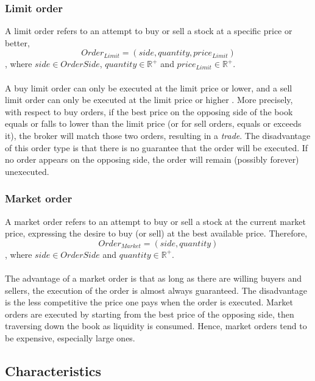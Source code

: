 \subsubsection{Limit order}
\label{sec:limit-order}

A limit order refers to an attempt to buy or sell a stock at a specific price or better,
\begin{equation}\label{eq:order-limit}
    Order_{Limit}=(side, quantity, price_{Limit})
\end{equation}
, where $side \in OrderSide$, $quantity \in \mathbb{R^+}$ and $price_{Limit} \in \mathbb{R^+}$.
\\
\\
A buy limit order can only be executed at the limit price or lower, and a sell limit order can only be executed at the limit price or higher \cite{sec-limit-order}.
More precisely, with respect to buy orders, if the best price on the opposing side of the book equals or falls to lower than the limit price (or for sell orders, equals or exceeds it), the broker will match those two orders, resulting in a \textit{trade}.
The disadvantage of this order type is that there is no guarantee that the order will be executed.
If no order appears on the opposing side, the order will remain (possibly forever) unexecuted.

\subsubsection{Market order}
\label{sec:market-order}

A market order refers to an attempt to buy or sell a stock at the current market price, expressing the desire to buy (or sell) at the best available price. Therefore,
\begin{equation}
Order_{Market}=(side, quantity)
\end{equation}
, where $side \in OrderSide$ and $quantity \in \mathbb{R^+}$.
\\
\\
The advantage of a market order is that as long as there are willing buyers and sellers, the execution of the order is almost always guaranteed. \cite{sec-market-order}
The disadvantage is the less competitive the price one pays when the order is executed.
Market orders are executed by starting from the best price of the opposing side, then traversing down the book as liquidity is consumed. 
Hence, market orders tend to be expensive, especially large ones.

\subsection{Characteristics}
\label{sec:ob-characteristics}

